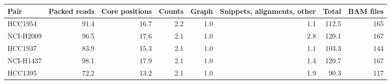 \begin{tabular}{lrrrrrrr}
\toprule
Pair & Packed reads & Core positions & Counts & Graph & Snippets, alignments, other & Total & BAM files \\
\midrule
HCC1954 & 91.4 & 16.7 & 2.2 & 1.0 & 1.1 & 112.5 & 165 \\
NCI-H2009 & 96.5 & 17.6 & 2.1 & 1.0 & 2.8 & 120.1 & 167 \\
HCC1937 & 83.9 & 15.3 & 2.1 & 1.0 & 1.1 & 103.3 & 144 \\
NCI-H1437 & 98.1 & 17.9 & 2.1 & 1.0 & 1.4 & 120.7 & 167 \\
HCC1395 & 72.2 & 13.2 & 2.1 & 1.0 & 1.9 & 90.3 & 117 \\
\bottomrule
\end{tabular}
